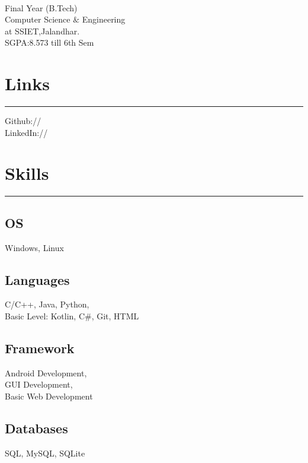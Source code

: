 \documentclass[]{sapna-resume}
\begin{document}
%
%

\begin{minipage}[t]{0.33\textwidth} 
\begin{large}
	\\
\end{large}
\vspace{3pt}
Final Year (B.Tech)\\
Computer Science $\&$  Engineering\\ 
at SSIET,Jalandhar. \\ 
SGPA:8.573 till 6th Sem 
\section{Links} 
\noindent\rule{5cm}{0.4pt}

Github:// \href{https://github.com/SapnaGulati}{} \\
LinkedIn:// \href{https://www.linkedin.com/in/sapna-gulati-5a44ba19a}{}
\section{Skills}
\noindent\rule{5cm}{0.4pt}
\subsection{OS}
Windows, Linux
\vspace{6pt}
\subsection{Languages}
C/C++, Java, Python, \\ Basic Level: Kotlin, C\#, Git, HTML
\vspace{6pt}
\subsection{Framework}
Android Development, \\GUI Development,
\\Basic Web Development
\vspace{6pt}
\subsection{Databases}
SQL, MySQL, SQLite
\vspace{6pt}

\end{minipage}
\end{document}
